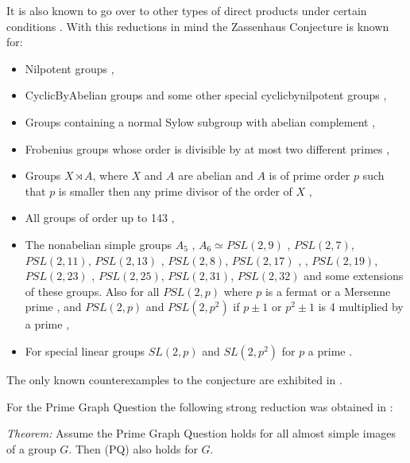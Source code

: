 \documentclass[a4paper,11pt]{report}
\begin{document}
{{ It is also known to go over to other types of direct products under certain
conditions \cite{BachleKimmerleSerrano}. With this reductions in mind the Zassenhaus Conjecture is known for: 
\begin{itemize}
\item  Nilpotent groups \cite{Weiss91}, 
\item  Cyclic\texttt{}By\texttt{}Abelian groups \cite{CyclicByAbelian} and some other special
cyclic\texttt{}by\texttt{}nilpotent groups \cite{CaicedoDelRio20}, 
\item  Groups containing a normal Sylow subgroup with abelian complement \cite{HertweckColloq}, 
\item  Frobenius groups whose order is divisible by at most two different primes \cite{JuriaansMilies}, 
\item  Groups $X \rtimes A$, where $X$ and $A$ are abelian and $A$ is of prime order $p$ such that $p$ is smaller then any prime divisor of the order of $X$ \cite{MRSW}, 
\item  All groups of order up to 143 \cite{BaHeKoMaSi}, 
\item  The non\texttt{}abelian simple groups $A_5$ \cite{LP}, $A_6 \simeq PSL(2,9)$ \cite{HerA6}, $PSL(2,7)$, $PSL(2,11)$, $PSL(2,13)$ \cite{HertweckBrauer}, $PSL(2,8)$, $PSL(2,17)$ \cite{KonovalovKimmiStAndrews}, \cite{Gildea}, $PSL(2,19)$, $PSL(2,23)$ \cite{BaMaM10}, $PSL(2,25)$, $PSL(2,31)$, $PSL(2,32)$ \cite{BaMa4prII} and some extensions of these groups. Also for all $PSL(2,p)$ where $p$ is a fermat or a Mersenne prime \cite{FermatMersenne}, and $PSL(2,p)$ and $PSL(2,p^2)$ if $p \pm 1$ or $p^2 \pm 1$ is 4 multiplied by a prime \cite{EiseleMargolisDefect1}, 
\item  For special linear groups $SL(2,p)$ and $SL(2,p^2)$ for $p$ a prime \cite{delRioSerrano19}. 
\end{itemize}
 

 The only known counterexamples to the conjecture are exhibited in \cite{EiMa18}.

 

 For the Prime Graph Question the following strong reduction was obtained in \cite{KonovalovKimmiStAndrews}: 

 \emph{Theorem:} Assume the Prime Graph Question holds for all almost simple images of a group $G$. Then (PQ) also holds for $G.$

}}
\end{document}
